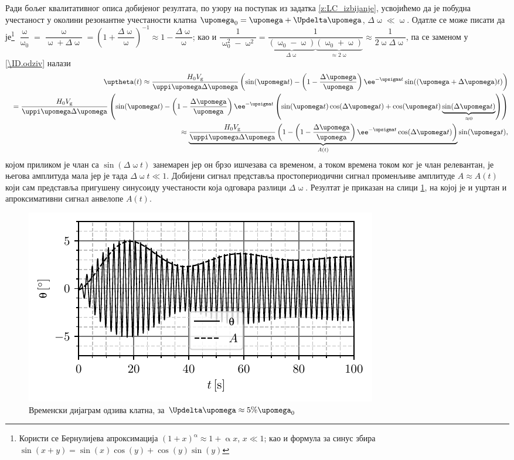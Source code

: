 Ради бољег квалитативног описа добијеног резултата, по узору на поступак из задатка \ref{z:LC_izbijanje}, усвојићемо  
да је побудна учестаност у околини резонантне учестаности клатна 
$\upomega_0 = \upomega + \Updelta\upomega$, $\Delta \upomega \ll \upomega$. Одатле се може писати да је\footnote{
    Користи се Бернулијева апроксимација $(1+x)^\upalpha \approx 1 + \upalpha x$, $x \ll 1$; као и формула за синус збира
    $\sin(x+y) = \sin(x)\cos(y) + \cos(y)\sin(y)$
}
$
\dfrac{\upomega}{\upomega_0} = \dfrac{\upomega}{\upomega + \Delta \upomega} = \left(1 + \dfrac{\Delta \upomega}{\upomega} \right)^{-1} \approx 
1 - \dfrac{\Delta \upomega}{\upomega}$; као и 
$
\dfrac{1}{\upomega_0^2 - \upomega^2} = 
\dfrac{1}{\underbrace{(\upomega_0 - \upomega)}_{\Delta\upomega} \underbrace{(\upomega_0 + \upomega)}_{\approx 2\upomega} } \approx 
\dfrac{1}{2\upomega \Delta \upomega}
$, па се заменом у \eqref{\ID.odziv} налази 
\begin{eqnarray*}
    && \uptheta(t) \approx \dfrac{H_0 V_{\rm g}}{\uppi \upomega \Delta \upomega}
    \left(
        \sin(\upomega t )
        -
        \left(1 - \dfrac{\Delta \upomega}{\upomega}\right) \ee^{-\upsigma t} \sin( (\upomega + \Delta \upomega) t )
    \right) \\
    &&=
    \dfrac{H_0 V_{\rm g}}{\uppi \upomega \Delta \upomega}
    \left(
        \sin(\upomega t )
        -
        \left(1 - \dfrac{\Delta \upomega}{\upomega}\right) \ee^{-\upsigma t} 
        \left(
            \sin( \upomega t )  \cos(\Delta \upomega t ) + \cos( \upomega t )  \underbrace{\sin(\Delta \upomega t ) }_{\approx 0}
        \right)
    \right) \\ 
    && \approx
    \underbrace{\dfrac{H_0 V_{\rm g}}{\uppi \upomega \Delta \upomega}
        \left(
            1 - \left(1 - \dfrac{\Delta \upomega}{\upomega}\right) \ee^{-\upsigma t} \cos(\Delta \upomega t ) 
        \right)}_{A(t)} \sin(\upomega t),
\end{eqnarray*}
којом приликом је члан са $\sin(\Delta\upomega t)$ занемарен јер он брзо ишчезава са временом, а током времена током ког је члан релевантан, 
је његова амплитуда мала јер је тада $\Delta \upomega t \ll 1$. Добијени сигнал представља простопериодични сигнал променљиве амплитуде 
$A \approx A(t)$ 
који сам представља пригушену синусоиду учестаности која одговара разлици $\Delta \upomega$. Резултат је приказан на слици \ref{\ID.res}, 
на којој је и уцртан и апроксимативни сигнал анвелопе $A(t)$.

\begin{figure}[ht!]
    \centering
    \includegraphics{fig/klatno_plot.pdf}
    \caption{Временски дијаграм одзива клатна, за $\Updelta \upomega \approx 5\% \upomega_0$}
    \label{\ID.res}
\end{figure}